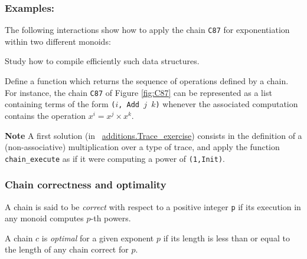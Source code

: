 



\subsubsection*{Examples:} 
The following interactions show how to apply the chain \texttt{C87} 
for exponentiation within two different monoids:



\begin{project}
Study how  to compile efficiently such data structures.

\end{project}

\begin{project}
Define a function which returns the sequence of operations defined by a chain.
For instance, the chain \texttt{C87} of Figure \ref{fig:C87} can be represented as a 
list containing terms of the form \texttt{($i$, Add $j$ $k$)} whenever the associated computation contains the operation $x^i=x^j\times x^k$.


\textbf{Note} A first solution (in ~\href{../theories/html/additions.Trace_exercise.html}{additions.Trace\_exercise}) consists in the definition of 
a (non-associative) multiplication over a type of trace, and apply the function
\texttt{chain\_execute} as if it were computing a power of \texttt{(1,Init)}.

\end{project}

\subsubsection{Chain correctness and optimality}

A chain is said to be \emph{correct} with respect to a positive
integer \texttt{p} if its execution in any monoid computes $p$-th powers.

\label{chain-correct-def}




\begin{definition}
A chain $c$ is \emph{optimal} for a given exponent $p$ if its length is less 
than or equal to
the length of any chain correct for $p$.  
\end{definition}


